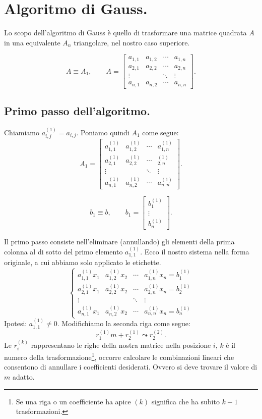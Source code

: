 

\chapter{Algoritmo di Gauss.}
Lo scopo dell'algoritmo di Gauss è quello di trasformare una matrice quadrata
$A$ in una equivalente $A_n$ triangolare, nel nostro caso superiore.

\[
A \equiv A_1, \qquad
A = \left[
\begin{array}{cccc}
a_{1,1} & a_{1,2} & \cdots & a_{1,n} \\
a_{2,1} & a_{2,2}& \cdots &  a_{2,n} \\
\vdots & & \ddots & \vdots \\
a_{n,1}& a_{n,2} & \cdots & a_{n,n}
\end{array} \right].
\]
\section{Primo passo dell'algoritmo.}
Chiamiamo $a_{i,j}^{(1)} = a_{i,j}$. Poniamo quindi $A_1$ come segue:
\[
A_1 = \left[
\begin{array}{cccc}
a_{1,1}^{(1)} & a_{1,2}^{(1)} & \cdots & a_{1,n}^{(1)} \\
a_{2,1}^{(1)} & a_{2,2}^{(1)}& \cdots & _{2,n}^{(1)} \\
\vdots & &\ddots & \vdots \\
a_{n,1}^{(1)}& a_{n,2}^{(1)} & \cdots & a_{n,n}^{(1)}
\end{array} \right].
\]

\[
b_1 \equiv b, \qquad
b_1 = \left[ \begin{array}{c}
b_{1}^{(1)} \\
\vdots \\
b_{n}^{(1)}
\end{array}\right].
\]

Il primo passo consiste nell'eliminare (annullando) gli elementi
della prima colonna al di sotto del primo elemento $a_{1,1}^{(1)}$. Ecco il
nostro sistema nella forma originale, a cui abbiamo solo applicato le
etichette.
\[
\left\{
\begin{array}{cccc}
a_{1,1}^{(1)}x_1 & a_{1,2}^{(1)}x_2 & \cdots & a_{1,n}^{(1)}x_n = b_{1}^{(1)}\\
a_{2,1}^{(1)}x_1 & a_{2,2}^{(1)}x_2 & \cdots & a_{2,n}^{(1)}x_n = b_{2}^{(1)}\\
\vdots & &\ddots & \vdots \\
a_{n,1}^{(1)}x_1 & a_{n,2}^{(1)}x_2 & \cdots & a_{n,n}^{(1)}x_n = b_{n}^{(1)}
\end{array}\right .
\]
Ipotesi: $a_{1,1}^{(1)} \neq 0$. Modifichiamo la seconda riga come segue:
\[
r_1^{(1)}m + r_2^{(1)} \leadsto r_2^{(2)}.
\]
Le $r_i^{(k)}$ rappresentano le righe della nostra matrice nella posizione $i$,
$k$ è il numero della trasformazione\footnote{Se una riga o un coefficiente
ha apice $(k)$ significa che ha subito $k-1$ trasformazioni.}, occorre
calcolare le
combinazioni lineari che consentono di annullare i coefficienti desiderati.
Ovvero si deve trovare il valore di $m$ adatto.


